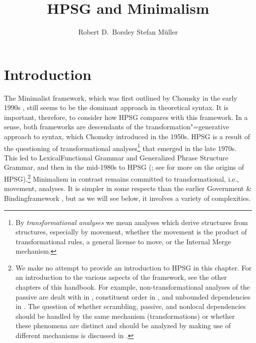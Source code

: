 \documentclass[output=paper,biblatex,babelshorthands,newtxmath,draftmode,colorlinks,citecolor=brown]{langscibook}
\author{Robert D.\ Borsley\affiliation{University of Essex and Bangor University} \lastand Stefan Müller\affiliation{Humboldt-Universität zu Berlin}}
\title{HPSG and Minimalism}
\begin{document}
\maketitle
\label{chap-minimalism}

\section{Introduction}
\label{sec:min-intro}\label{minimalism:sec-intro}


The Minimalist framework, which was first outlined by Chomsky in the early 1990s
\citep{Chomsky93b-u,Chomsky95a-u}, still seems to be the dominant approach in theoretical syntax. It is
important, therefore, to consider how HPSG compares with this framework. In a sense, both frameworks
are descendants of the transformation"=generative approach to syntax, which Chomsky introduced in the
1950s. HPSG is a result of the questioning of transformational analyses\footnote{%
By \emph{transformational analyses} we mean analyses which derive structures from structures, especially
by movement, whether the movement is the product of transformational rules, a general license to
move, or the Internal Merge mechanism.} that emerged in the late
1970s. This led to Lexical\indexlfg Functional Grammar \citep{BK82a} and Generalized Phrase Structure Grammar\indexgpsg \citep*{GKPS85a}, and then in
the mid-1980s to HPSG (\citealt{ps}; see  for more on the origins of HPSG).\footnote{
We make no attempt to provide an introduction to HPSG in this chapter. For an introduction to the
various aspects of the framework, see the other chapters of this handbook. For example,
non-transformational analyses of the passive are dealt with in ,
constituent order in , and unbounded dependencies in . The
question of whether scrambling, passive, and nonlocal dependencies should be handled by the same
mechanism (\eg transformations) or whether these phenomena are distinct and should be analyzed by
making use of different mechanisms is discussed in .%
} Minimalism in contrast
remains committed to transformational, i.e., movement, analyses. It is simpler in some respects than
the earlier Government \& Binding\indexgb framework \citep{Chomsky81a}, but as we will see below, it involves a variety of
complexities. 
\end{document}
